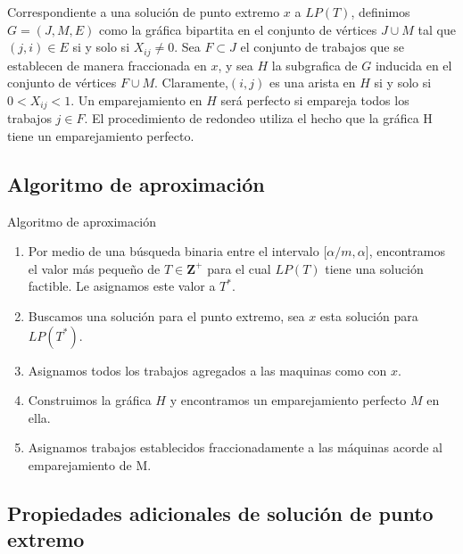 \begin{frame}{\subsectiontitle}
    Correspondiente a una solución de punto extremo $x$ a $LP(T)$,
definimos $G = ( J, M, E)$ como la gráfica bipartita en el conjunto de vértices $J \cup M$ tal que $(j, i) \in E$ si y solo si $X_{ij} \neq 0$. Sea $F \subset J$ el conjunto de trabajos que se establecen de manera fraccionada en $x$, y sea $H$ la subgrafica de $G$ inducida en el conjunto de vértices $F\cup M$. Claramente,$( i, j )$ es una arista en $H$ si y solo si $0 < X_{ij} < 1$. Un emparejamiento en $H$ será perfecto si empareja todos los trabajos $j \in F$. El procedimiento de redondeo utiliza el hecho que la gráfica H tiene un emparejamiento perfecto.
\end{frame}

\renewcommand{\subsectiontitle}{Algoritmo de aproximación}
\subsection{\subsectiontitle}

\begin{frame}{\subsectiontitle}
\begin{enumerate}
    \item Por medio de una búsqueda binaria entre el intervalo [$\alpha/m, \alpha$], encontramos el valor más pequeño de $T\in \mathbf{Z}^+$ para el cual $LP(T)$ tiene una solución factible. Le asignamos este valor a $T^*$.%
    \item Buscamos una solución para el punto extremo, sea $x$ esta solución para $LP(T^*)$.%
    \item Asignamos todos los trabajos agregados a las maquinas como con $x$.%
    \item Construimos la gráfica $H$ y encontramos un emparejamiento perfecto $M$ en ella.%
    \item Asignamos trabajos establecidos fraccionadamente a las máquinas acorde al emparejamiento de M.%
\end{enumerate}
\end{frame}

\renewcommand{\subsectiontitle}{Propiedades adicionales de solución de punto extremo}
\subsection{\subsectiontitle}

